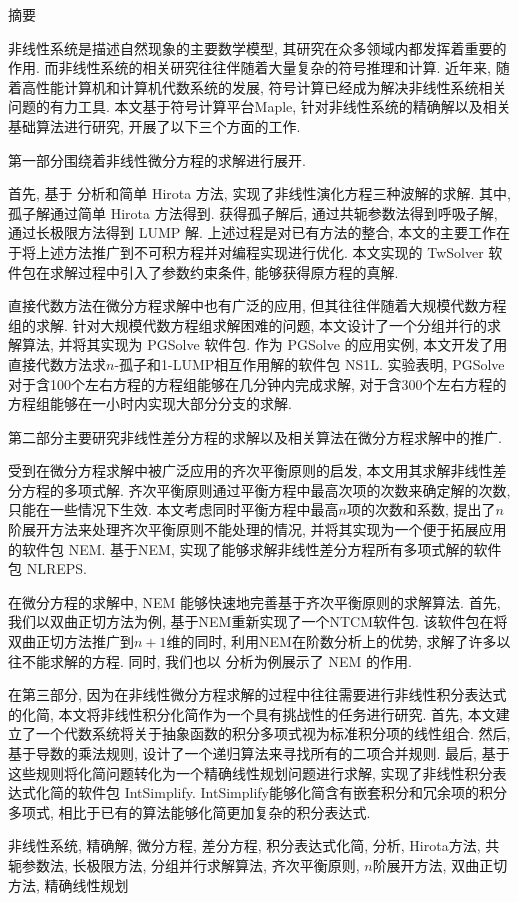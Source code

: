 {}
\centerline{\heiti 摘\quad 要}

\linespread{1.4} \bigskip

非线性系统是描述自然现象的主要数学模型, 其研究在众多领域内都发挥着重要的作用. 而非线性系统的相关研究往往伴随着大量复杂的符号推理和计算. 近年来, 随着高性能计算机和计算机代数系统的发展, 符号计算已经成为解决非线性系统相关问题的有力工具. 本文基于符号计算平台Maple, 针对非线性系统的精确解以及相关基础算法进行研究, 开展了以下三个方面的工作. 

第一部分围绕着非线性微分方程的求解进行展开. 

首先, 基于 \Painleve{} 分析和简单 Hirota 方法, 实现了非线性演化方程三种波解的求解. 其中, 孤子解通过简单 Hirota 方法得到. 获得孤子解后, 通过共轭参数法得到呼吸子解, 通过长极限方法得到 LUMP 解. 上述过程是对已有方法的整合, 本文的主要工作在于将上述方法推广到不可积方程并对编程实现进行优化. 本文实现的 TwSolver 软件包在求解过程中引入了参数约束条件, 能够获得原方程的真解.  

直接代数方法在微分方程求解中也有广泛的应用, 但其往往伴随着大规模代数方程组的求解. 针对大规模代数方程组求解困难的问题, 本文设计了一个分组并行的求解算法, 并将其实现为 PGSolve 软件包. 作为 PGSolve 的应用实例, 本文开发了用直接代数方法求$n$-孤子和1-LUMP相互作用解的软件包 NS1L. 实验表明, PGSolve 对于含100个左右方程的方程组能够在几分钟内完成求解, 对于含300个左右方程的方程组能够在一小时内实现大部分分支的求解. 

第二部分主要研究非线性差分方程的求解以及相关算法在微分方程求解中的推广. 

受到在微分方程求解中被广泛应用的齐次平衡原则的启发, 本文用其求解非线性差分方程的多项式解. 齐次平衡原则通过平衡方程中最高次项的次数来确定解的次数, 只能在一些情况下生效. 本文考虑同时平衡方程中最高$n$项的次数和系数, 提出了$n$阶展开方法来处理齐次平衡原则不能处理的情况, 并将其实现为一个便于拓展应用的软件包 NEM. 基于NEM, 实现了能够求解非线性差分方程所有多项式解的软件包 NLREPS. 

在微分方程的求解中, NEM 能够快速地完善基于齐次平衡原则的求解算法. 首先, 我们以双曲正切方法为例, 基于NEM重新实现了一个NTCM软件包. 该软件包在将双曲正切方法推广到$n+1$维的同时, 利用NEM在阶数分析上的优势, 求解了许多以往不能求解的方程. 同时, 我们也以 \Painleve{} 分析为例展示了 NEM 的作用. 

在第三部分, 因为在非线性微分方程求解的过程中往往需要进行非线性积分表达式的化简, 本文将非线性积分化简作为一个具有挑战性的任务进行研究. 首先, 本文建立了一个代数系统将关于抽象函数的积分多项式视为标准积分项的线性组合. 然后, 基于导数的乘法规则, 设计了一个递归算法来寻找所有的二项合并规则. 最后, 基于这些规则将化简问题转化为一个精确线性规划问题进行求解, 实现了非线性积分表达式化简的软件包 IntSimplify.  IntSimplify能够化简含有嵌套积分和冗余项的积分多项式, 相比于已有的算法能够化简更加复杂的积分表达式. 

\bigskip

非线性系统, 精确解, 微分方程, 差分方程, 积分表达式化简, \Painleve{}分析, Hirota方法, 共轭参数法, 长极限方法, 分组并行求解算法, 齐次平衡原则, $n$阶展开方法, 双曲正切方法, 精确线性规划




